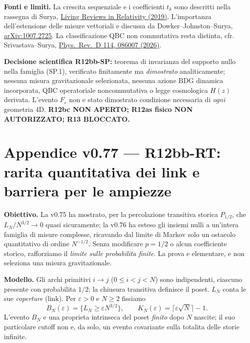 \documentclass[11pt,a4paper]{article}
\begin{document}
\textbf{Fonti e limiti.} La crescita sequenziale e i coefficienti $t_k$ sono descritti nella rassegna di Surya, \href{https://doi.org/10.1007/s41114-019-0023-1}{Living Reviews in Relativity (2019)}. L'importanza dell'estensione delle misure vettoriali e discussa da Dowker--Johnston--Surya, \href{https://arxiv.org/abs/1007.2725}{arXiv:1007.2725}. La classificazione QBC non commutativa resta distinta, cfr. Srivastava--Surya, \href{https://doi.org/10.1103/thx5-dknv}{Phys.~Rev.~D 114, 086007 (2026)}.

\textbf{Decisione scientifica R12bb-SP:} teorema di invarianza del supporto nullo nella famiglia (SP.1), verificato finitamente ma \emph{dimostrato} analiticamente; nessuna misura gravitazionale selezionata, nessuna azione BDG dinamica incorporata, QBC operatoriale noncommutativa o legge cosmologica $H(z)$ derivata. L'evento $F_\varepsilon$ non e stato dimostrato condizione necessaria di \emph{ogni} geometria 4D. \textbf{R12bc NON APERTO; R12as fisico NON AUTORIZZATO; R13 BLOCCATO.}


\clearpage
\section*{Appendice v0.77 --- R12bb-RT: rarita quantitativa dei link e barriera per le ampiezze}
\textbf{Obiettivo.} La v0.75 ha mostrato, per la percolazione transitiva storica $P_{1/2}$, che $L_N/N^{3/2}\to0$ quasi sicuramente; la v0.76 ha esteso gli insiemi nulli a un'intera famiglia di misure complesse, ricavando dal limite di Markov solo un ostacolo quantitativo di ordine $N^{-1/2}$. Senza modificare $p=1/2$ o alcun coefficiente storico, rafforziamo il \emph{limite sulle probabilita finite}. La prova e elementare, e non seleziona una misura gravitazionale.

\textbf{Modello.} Gli archi primitivi $i\to j$ ($0\le i<j<N$) sono indipendenti, ciascuno presente con probabilita $1/2$; la chiusura transitiva definisce il poset. $L_N$ conta le sue \emph{coperture} (link). Per $\varepsilon>0$ e $N\ge2$ fissiamo
\begin{equation}
 B_N(\varepsilon)=\{L_N\ge\varepsilon N^{3/2}\},\qquad
 K_N(\varepsilon)=\lceil\varepsilon\sqrt{N}\rceil-1.\tag{RT.1}
\end{equation}
L'evento $B_N$ e una proprieta intrinseca del poset \emph{finito} dopo $N$ nascite; il suo particolare cutoff non e, da solo, un evento covariante sulla totalita delle storie infinite.
\end{document}
